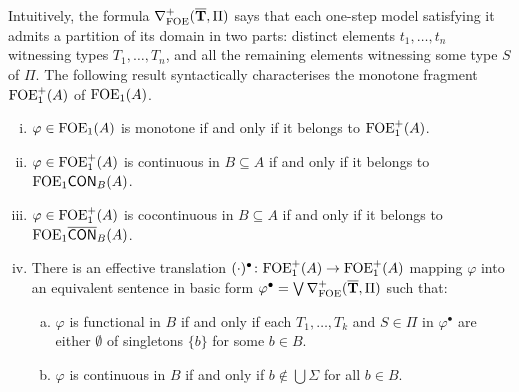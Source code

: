 Intuitively, the formula $\nabla^+_{\mathrm{FOE}}(\overline{{\mathbf{T}}},\Pi)$ says that each one-step model satisfying it admits a partition of its domain in two parts: distinct elements $t_1,\dots,t_n$ witnessing types $T_1,\dots,T_n$, and all the remaining elements witnessing some type $S$ of $\Pi$. The following result syntactically characterises the monotone fragment $\mathrm{FOE}_1^+(A)$ of $\mathrm{FOE}_1(A)$.


\begin{theorem} \label{th:ofoe-normalforms} 
\begin{enumerate}[(i)]
\item $\varphi  \in \mathrm{FOE}_1(A)$ is monotone if and only if it belongs to $\mathrm{FOE}_1^{+}(A)$. 
\item $\varphi  \in \mathrm{FOE}_1^{+}(A)$ is continuous in $B \subseteq A$ if and only if it belongs to $\mathrm{FOE}_1\mathsf{CON}_{B}(A)$. 
\item $\varphi  \in \mathrm{FOE}_1^{+}(A)$ is cocontinuous in $B \subseteq A$ if and only if it belongs to $\mathrm{FOE}_1\overline{\mathsf{CON}}_{B}(A)$. 
\item There is an effective translation $(\cdot)^{\bullet} \colon \mathrm{FOE}_1^{+}(A) \to \mathrm{FOE}_1^{+}(A)$ mapping $\varphi$ into an equivalent sentence in basic form $\varphi^{\bullet} = \bigvee \nabla^+_{\mathrm{FOE}}(\overline{{\mathbf{T}}},\Pi)$ such that:
\begin{enumerate}[(a)]
\item $\varphi$ is functional in $B$ if and only if each $T_1, \dots, T_k$ and $S \in \Pi$ in $\varphi^{\bullet}$ are either $\emptyset$ of singletons $\{b\}$ for some $b \in B$.
\item $\varphi$ is continuous in $B$ if and only if $b\notin \bigcup\Sigma$ for all $b \in B$.
\end{enumerate}
\end{enumerate}
\end{theorem}



